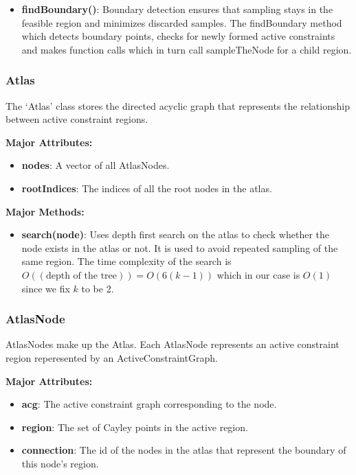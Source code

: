 \begin{itemize}
		\item  \textbf{findBoundary()}: Boundary detection ensures that sampling 
				stays in the feasible region and minimizes discarded samples. 
				The findBoundary method which detects boundary points, checks 
				for newly formed active constraints and makes function calls
				which in turn call sampleTheNode for a child region.
		
\end{itemize}

\subsubsection{Atlas} 
The `Atlas' class stores the directed acyclic graph that represents the relationship between active constraint regions.

\noindent \textbf{Major Attributes:}
\begin{itemize}
		\item \textbf{nodes}: A vector of all AtlasNodes. 
		\item \textbf{rootIndices}: The indices of all the root nodes in the atlas.
\end{itemize}

\noindent \textbf{Major Methods:}
\begin{itemize}
		\item \textbf{search(node)}: Uses depth first search on the atlas to check
				whether the node exists in the atlas or not. It is used to avoid
				repeated sampling of the same region. The time complexity of
				the search is $O((\text{depth of the tree})) = O(6(k-1)) $ which in our 
				case is $O(1)$ since we fix $k$ to be 2.
\end{itemize}


\subsubsection{AtlasNode} 
AtlasNodes make up the Atlas. Each AtlasNode represents an active constraint region
reperesented by an ActiveConstraintGraph.

\noindent \textbf{Major Attributes:}
\begin{itemize}
		\item \textbf{acg}: The active constraint graph corresponding to the node.
		\item \textbf{region}: The set of Cayley points in the active region.
		\item \textbf{connection}: The id of the nodes in the atlas that
				represent the boundary of this node's region.
\end{itemize}

